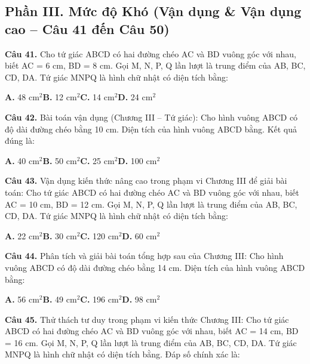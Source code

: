 \documentclass[11pt,a4paper]{article}
\begin{document}
\subsection*{\color{accent} Phần III. Mức độ Khó (Vận dụng \& Vận dụng cao -- Câu 41 đến Câu 50)}
\textbf{\color{primary} Câu 41.} Cho tứ giác ABCD có hai đường chéo AC và BD vuông góc với nhau, biết AC = 6 cm, BD = 8 cm. Gọi M, N, P, Q lần lượt là trung điểm của AB, BC, CD, DA. Tứ giác MNPQ là hình chữ nhật có diện tích bằng:\par
\hspace*{1.5em}\textbf{A.} 48 cm$^2$\quad\quad \textbf{B.} 12 cm$^2$\quad\quad \textbf{C.} 14 cm$^2$\quad\quad \textbf{D.} 24 cm$^2$\par\vspace{2pt}
\textbf{\color{primary} Câu 42.} Bài toán vận dụng (Chương III – Tứ giác): Cho hình vuông ABCD có độ dài đường chéo bằng 10 cm. Diện tích của hình vuông ABCD bằng. Kết quả đúng là:\par
\hspace*{1.5em}\textbf{A.} 40 cm$^2$\quad\quad \textbf{B.} 50 cm$^2$\quad\quad \textbf{C.} 25 cm$^2$\quad\quad \textbf{D.} 100 cm$^2$\par\vspace{2pt}
\textbf{\color{primary} Câu 43.} Vận dụng kiến thức nâng cao trong phạm vi Chương III để giải bài toán: Cho tứ giác ABCD có hai đường chéo AC và BD vuông góc với nhau, biết AC = 10 cm, BD = 12 cm. Gọi M, N, P, Q lần lượt là trung điểm của AB, BC, CD, DA. Tứ giác MNPQ là hình chữ nhật có diện tích bằng:\par
\hspace*{1.5em}\textbf{A.} 22 cm$^2$\quad\quad \textbf{B.} 30 cm$^2$\quad\quad \textbf{C.} 120 cm$^2$\quad\quad \textbf{D.} 60 cm$^2$\par\vspace{2pt}
\textbf{\color{primary} Câu 44.} Phân tích và giải bài toán tổng hợp sau của Chương III: Cho hình vuông ABCD có độ dài đường chéo bằng 14 cm. Diện tích của hình vuông ABCD bằng:\par
\hspace*{1.5em}\textbf{A.} 56 cm$^2$\quad\quad \textbf{B.} 49 cm$^2$\quad\quad \textbf{C.} 196 cm$^2$\quad\quad \textbf{D.} 98 cm$^2$\par\vspace{2pt}
\textbf{\color{primary} Câu 45.} Thử thách tư duy trong phạm vi kiến thức Chương III: Cho tứ giác ABCD có hai đường chéo AC và BD vuông góc với nhau, biết AC = 14 cm, BD = 16 cm. Gọi M, N, P, Q lần lượt là trung điểm của AB, BC, CD, DA. Tứ giác MNPQ là hình chữ nhật có diện tích bằng. Đáp số chính xác là:\par
\end{document}
